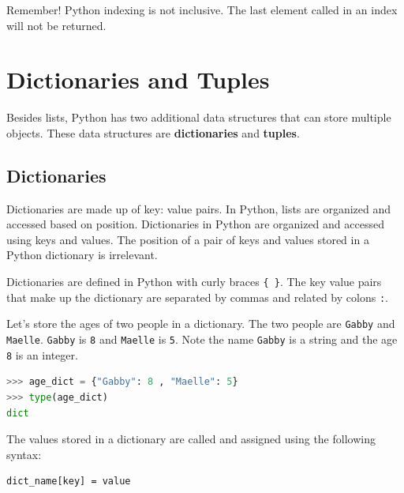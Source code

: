 \documentclass{book}
\begin{document}
Remember! Python indexing is not inclusive. The last element called in
an index will not be returned.
    




    
        \section{Dictionaries and Tuples}\label{dictionaries-and-tuples}
    




    
        Besides lists, Python has two additional data structures that can store
multiple objects. These data structures are \textbf{dictionaries} and
\textbf{tuples}.
    




    
        \subsection{Dictionaries}\label{dictionaries}
    




    
        Dictionaries are made up of key: value pairs. In Python, lists are
organized and accessed based on position. Dictionaries in Python are
organized and accessed using keys and values. The position of a pair of
keys and values stored in a Python dictionary is irrelevant.

Dictionaries are defined in Python with curly braces \lstinline!{ }!.
The key value pairs that make up the dictionary are separated by commas
and related by colons \lstinline!:!.

Let's store the ages of two people in a dictionary. The two people are
\lstinline!Gabby! and \lstinline!Maelle!. \lstinline!Gabby! is
\lstinline!8! and \lstinline!Maelle! is \lstinline!5!. Note the name
\lstinline!Gabby! is a string and the age \lstinline!8! is an integer.

\begin{lstlisting}[language=Python]
>>> age_dict = {"Gabby": 8 , "Maelle": 5}
>>> type(age_dict)
dict
\end{lstlisting}

The values stored in a dictionary are called and assigned using the
following syntax:

\begin{lstlisting}
dict_name[key] = value
\end{lstlisting}
\end{document}
